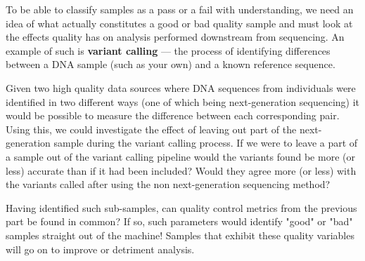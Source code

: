To be able to classify samples as a pass or a fail with understanding, we need
an idea of what actually constitutes a good or bad quality sample and must look
at the effects quality has on analysis performed downstream from sequencing.
An example of such is \textbf{variant calling} --- the process of identifying
differences between a DNA sample (such as your own) and a known reference
sequence.

Given two high quality data sources where DNA sequences from individuals were
identified in two different ways (one of which being next-generation sequencing)
it would be possible to measure the difference between each corresponding pair.
Using this, we could investigate the effect of leaving out part of the
next-generation sample during the variant calling process.
If we were to leave a part of a sample out of the variant calling
pipeline would the variants found be more (or less) accurate than if it had been
included? Would they agree more (or less) with the variants called after using
the non next-generation sequencing method?

Having identified such sub-samples, can quality control metrics from the
previous part be found in common? If so, such parameters would identify "good"
or "bad" samples straight out of the machine! Samples that exhibit these quality
variables will go on to improve or detriment analysis.


